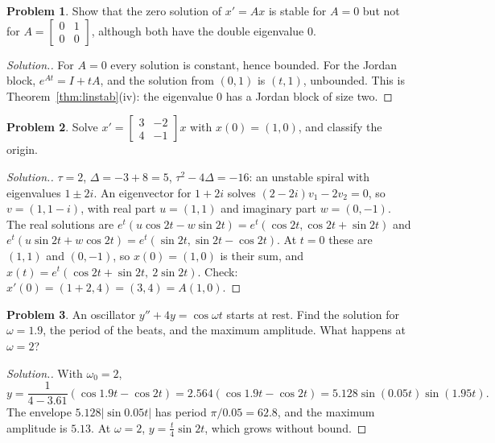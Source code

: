 \documentclass[11pt,a4paper]{article}
\numberwithin{equation}{section}
\theoremstyle{definition}
\newtheorem{problemx}{Problem}[subsection]
\newenvironment{problem}{\begin{problemx}}{\end{problemx}}
\newenvironment{solution}
  {\renewcommand{\qedsymbol}{}\begin{proof}[\textit{Solution}.]}
  {\end{proof}}
\begin{document}
\begin{problem}
Show that the zero solution of $x' = Ax$ is stable for $A = 0$ but not for $A = \begin{bmatrix} 0 & 1\\ 0 & 0\end{bmatrix}$, although both have the double eigenvalue $0$.
\end{problem}

\begin{solution}
For $A = 0$ every solution is constant, hence bounded. For the Jordan block, $e^{At} = I + tA$, and the solution from $(0, 1)$ is $(t, 1)$, unbounded. This is Theorem~\ref{thm:linstab}(iv): the eigenvalue $0$
has a Jordan block of size two.
\end{solution}

\begin{problem}
Solve $x' = \begin{bmatrix} 3 & -2\\ 4 & -1\end{bmatrix}x$ with $x(0) = (1, 0)$, and classify the origin.
\end{problem}

\begin{solution}
$\tau = 2$, $\Delta = -3 + 8 = 5$, $\tau^2 - 4\Delta = -16$: an unstable spiral with eigenvalues $1 \pm 2i$. An eigenvector for $1 + 2i$ solves $(2 - 2i)v_1 - 2v_2 = 0$, so $v = (1, 1 - i)$, with real part
$u = (1, 1)$ and imaginary part $w = (0, -1)$. The real solutions are $e^t(u\cos2t - w\sin2t) = e^t(\cos2t, \cos2t + \sin2t)$ and $e^t(u\sin2t + w\cos2t) = e^t(\sin2t, \sin2t - \cos2t)$. At $t = 0$ these are $(1, 1)$ and $(0, -1)$,
so $x(0) = (1, 0)$ is their sum, and $x(t) = e^t(\cos2t + \sin2t,\ 2\sin2t)$. Check: $x'(0) = (1 + 2, 4) = (3, 4) = A(1, 0)$.
\end{solution}

\begin{problem}
An oscillator $y'' + 4y = \cos\omega t$ starts at rest. Find the solution for $\omega = 1.9$, the period of the beats, and the maximum amplitude. What happens at $\omega = 2$?
\end{problem}

\begin{solution}
With $\omega_0 = 2$,
\[
y = \frac{1}{4 - 3.61}(\cos1.9t - \cos2t) = 2.564(\cos1.9t - \cos2t) = 5.128\sin(0.05t)\sin(1.95t) .
\]
The envelope $5.128|\sin0.05t|$ has period $\pi/0.05 = 62.8$, and the maximum amplitude is $5.13$.
At $\omega = 2$, $y = \frac t4\sin2t$, which grows without bound.
\end{solution}
\end{document}
